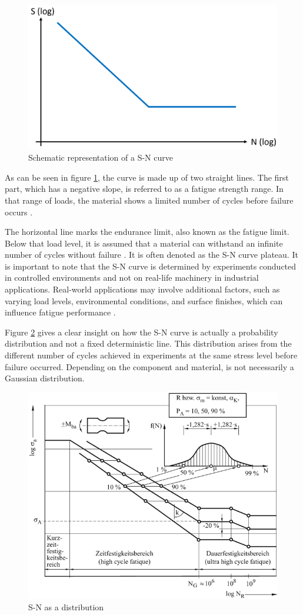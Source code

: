 \begin{figure}[H]
	\centering
	\includegraphics[width=0.75\linewidth]{IMGs/WO.png}
	\caption{Schematic representation of a S-N curve}
	\label{fig:WO}
\end{figure}

As can be seen in figure \ref{fig:WO}, the curve is made up of two straight lines. The first part, which has a negative slope, is referred to as a fatigue strength range. In that range of loads, the material shows a limited number of cycles before failure occurs \cite{Adasooriya}.

The horizontal line marks the endurance limit, also known as the fatigue limit. Below that load level, it is assumed that a material can withstand an infinite number of cycles without failure \cite{Bellows}. It is often denoted as the S-N curve plateau.
It is important to note that the S-N curve is determined by experiments conducted in controlled environments and not on real-life machinery in industrial applications. Real-world applications may involve additional factors, such as varying load levels, environmental conditions, and surface finishes, which can influence fatigue performance \cite{JanOveHolmen}. 

Figure \ref{fig:WO2} gives a clear insight on how the S-N curve is actually a probability distribution and not a fixed deterministic line. This distribution arises from the different number of cycles achieved in experiments at the same stress level before failure occurred. Depending on the component and material, is not necessarily a Gaussian distribution. 

\begin{figure}[H]
	\centering
	\includegraphics[width=0.7\linewidth]{IMGs/WO2.png}
	\caption{S-N as a distribution \cite{Klein}}
	\label{fig:WO2}
\end{figure}


